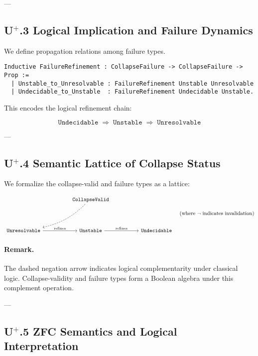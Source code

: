 \documentclass[11pt]{article}
\begin{document}
---

\subsection*{U$^{+}$.3 Logical Implication and Failure Dynamics}

We define propagation relations among failure types.

\begin{lstlisting}[language=Coq]
Inductive FailureRefinement : CollapseFailure -> CollapseFailure -> Prop :=
  | Unstable_to_Unresolvable : FailureRefinement Unstable Unresolvable
  | Undecidable_to_Unstable  : FailureRefinement Undecidable Unstable.
\end{lstlisting}

This encodes the logical refinement chain:

\[
\texttt{Undecidable} \;\Rightarrow\; \texttt{Unstable} \;\Rightarrow\; \texttt{Unresolvable}
\]

---

\subsection*{U$^{+}$.4 Semantic Lattice of Collapse Status}

We formalize the collapse-valid and failure types as a lattice:

\[
\begin{tikzcd}[column sep=1.8cm, row sep=1.5cm]
& \texttt{CollapseValid}
  \arrow[dl, dashed, bend left=15, ""{name=neglabel, midway, above left}] \\
\texttt{Unresolvable} \arrow[r, "\text{refines}"]
& \texttt{Unstable} \arrow[r, "\text{refines}"]
& \texttt{Undecidable}
\end{tikzcd}
\quad
\text{(where } \neg \text{ indicates invalidation)}
\]

\paragraph{Remark.}  
The dashed negation arrow indicates logical complementarity under classical logic.  
Collapse-validity and failure types form a Boolean algebra under this complement operation.

---

\subsection*{U$^{+}$.5 ZFC Semantics and Logical Interpretation}
\end{document}
